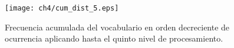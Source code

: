 \documentclass[letterpaper,12pt,oneside]{book} %
\begin{document}
\begin{figure}
    \centering
    \texttt{[image: ch4/cum\_dist\_5.eps]}
    \caption{Frecuencia acumulada del vocabulario en orden decreciente de ocurrencia aplicando hasta el quinto nivel de procesamiento.}
    \label{img:cum_dist5}
\end{figure}













\end{document}
